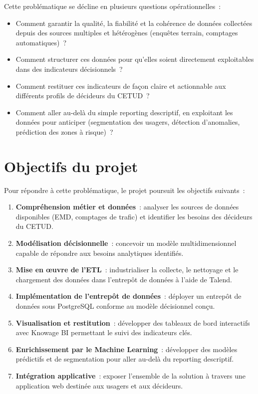 Cette problématique se décline en plusieurs questions opérationnelles~:
\begin{itemize}
\item Comment garantir la qualité, la fiabilité et la cohérence de données collectées depuis des sources multiples et hétérogènes (enquêtes terrain, comptages automatiques)~?
\item Comment structurer ces données pour qu'elles soient directement exploitables dans des indicateurs décisionnels~?
\item Comment restituer ces indicateurs de façon claire et actionnable aux différents profils de décideurs du CETUD~?
\item Comment aller au-delà du simple reporting descriptif, en exploitant les données pour anticiper (segmentation des usagers, détection d'anomalies, prédiction des zones à risque)~?
\end{itemize}

\section*{Objectifs du projet}
Pour répondre à cette problématique, le projet poursuit les objectifs suivants~:

\begin{enumerate}
\item \textbf{Compréhension métier et données}~: analyser les sources de données disponibles (EMD, comptages de trafic) et identifier les besoins des décideurs du CETUD.
\item \textbf{Modélisation décisionnelle}~: concevoir un modèle multidimensionnel capable de répondre aux besoins analytiques identifiés.
\item \textbf{Mise en œuvre de l'ETL}~: industrialiser la collecte, le nettoyage et le chargement des données dans l'entrepôt de données à l'aide de Talend.
\item \textbf{Implémentation de l'entrepôt de données}~: déployer un entrepôt de données sous PostgreSQL conforme au modèle décisionnel conçu.
\item \textbf{Visualisation et restitution}~: développer des tableaux de bord interactifs avec Knowage BI permettant le suivi des indicateurs clés.
\item \textbf{Enrichissement par le Machine Learning}~: développer des modèles prédictifs et de segmentation pour aller au-delà du reporting descriptif.
\item \textbf{Intégration applicative}~: exposer l'ensemble de la solution à travers une application web destinée aux usagers et aux décideurs.
\end{enumerate}

